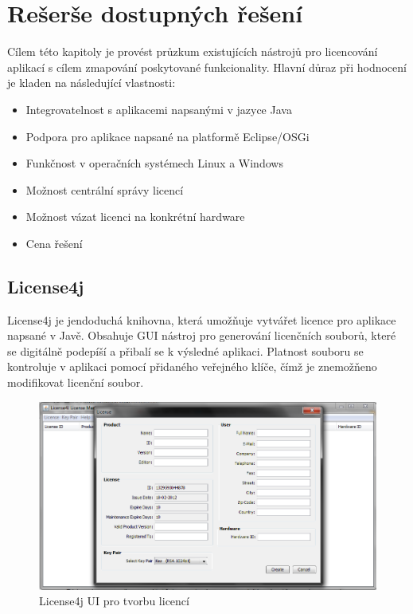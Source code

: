 \chapter{Rešerše dostupných řešení}

Cílem této kapitoly je provést průzkum existujících nástrojů pro licencování
aplikací s cílem zmapování poskytované funkcionality. Hlavní důraz při hodnocení
je kladen na následující vlastnosti:

\begin{itemize}
  \item Integrovatelnost s aplikacemi napsanými v jazyce Java
  \item Podpora pro aplikace napsané na platformě Eclipse/OSGi
  \item Funkčnost v operačních systémech Linux a Windows
  \item Možnost centrální správy licencí
  \item Možnost vázat licenci na konkrétní hardware
  \item Cena řešení 
\end{itemize}


\section{License4j}

License4j\cite{license4j} je jendoduchá knihovna, která umožňuje vytvářet
licence pro aplikace napsané v Javě. Obsahuje GUI nástroj pro generování
licenčních souborů, které se digitálně podepíší a přibalí se k výsledné
aplikaci. Platnost souboru se kontroluje v aplikaci pomocí přidaného veřejného
klíče, čímž je znemožňeno modifikovat licenční soubor.

\begin{figure}[H]
\begin{center}
\includegraphics[width=12cm]{figures/license4j.PNG}
\caption{License4j UI pro tvorbu licencí}
\label{fig:license4j-ui} 
\end{center}
\end{figure}

